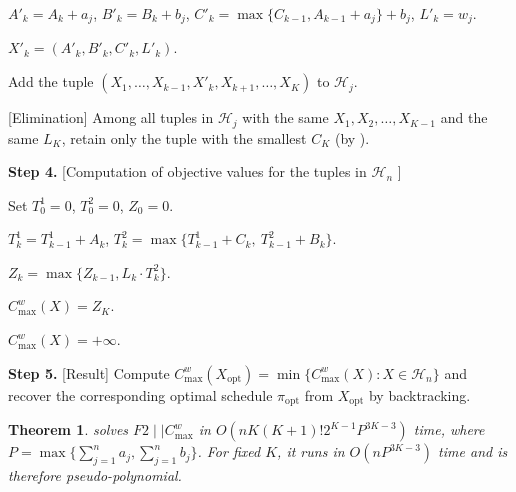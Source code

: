 \documentclass[12pt]{article} \textheight=24.5cm \textwidth=16.5cm \parskip = 0.165cm
\newtheorem{theorem}{Theorem}[section]
\begin{document}
\begin{sloppypar}
\begin{algorithm}[H]
            {
                {
                    {
                        $A'_k = A_k+a_j$, $B'_k = B_k+b_j$, $C'_k = \max\{C_{k-1}, A_{k-1}+a_j\}+b_j$, $L'_k= w_j$. \;
                        
                        $X'_k=(A'_k, B'_k, C'_k, L'_k)$. \;
                        
                        Add the tuple $(X_1, \ldots, X_{k-1}, X'_k, X_{k+1}, \ldots, X_K)$ to $\mathcal{H}_j$. \;
                    }
                }
                [Elimination] Among all tuples in $\mathcal{H}_j$ with the same $X_1, X_2, \ldots, X_{K-1}$ and the same $L_K$, retain only the tuple with the smallest $C_K$ (by ). \;
            }
            
            \textbf{Step 4.} [Computation of objective values for the tuples in $\mathcal{H}_n$ ]
            
            {
                {
                    Set $T_0^1= 0$, $T_0^2=0$, $Z_0=0$. \;
                    
                    {
                        $T_k^1= T_{k-1}^1+A_k$, $T_k^2 = \max\{T_{k-1}^1+C_k,\ T_{k-1}^2+B_k\}$. \;
                        
                        $Z_k = \max \{Z_{k-1}, L_k \cdot T_k^2\}$. \;
                    }
                    
                    $C_{\max}^w(X)=Z_K$. \;
                }{
                    $C_{\max}^w(X)=+\infty$. \;
                }
            }
            \textbf{Step 5.} [Result] Compute $C_{\max}^w(X_{\mathrm{opt}})=\min \{C_{\max}^w(X): X \in \mathcal{H}_n\}$ and recover the corresponding optimal schedule $\pi_{\mathrm{opt}}$ from $X_{\mathrm{opt}}$ by backtracking. \;
            
        \end{algorithm}
        
        
        \begin{theorem}\label{thm:complexity}
             solves $F2 \mid \mid C_{\max}^w$ in $O(n K (K+1)! 2^{K-1} P^{3K-3})$ time, where $P = \max \{\sum_{j=1}^{n}a_j, \sum_{j=1}^{n}b_j\}$.
            For fixed $K$, it runs in $O(nP^{3K-3})$ time and is therefore pseudo-polynomial.
        \end{theorem}
        

\end{sloppypar}
\end{document}
